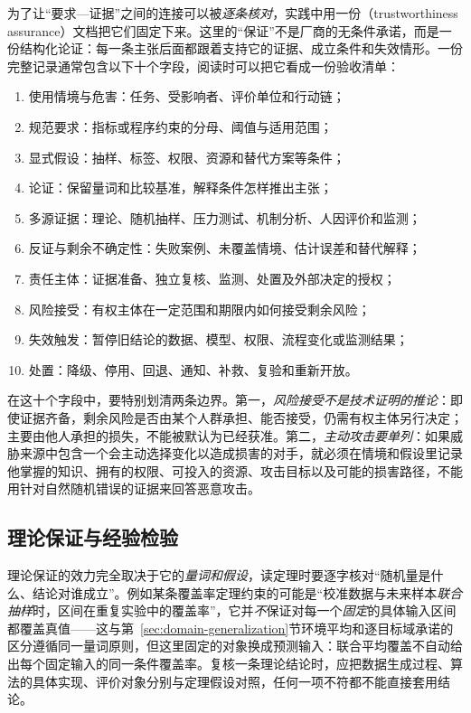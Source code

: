 为了让“要求—证据”之间的连接可以被\emph{逐条核对}，实践中用一份（trustworthiness assurance）文档把它们固定下来。这里的“保证”不是厂商的无条件承诺，而是一份结构化论证：每一条主张后面都跟着支持它的证据、成立条件和失效情形。一份完整记录通常包含以下十个字段，阅读时可以把它看成一份验收清单：
\begin{enumerate}
  \item 使用情境与危害：任务、受影响者、评价单位和行动链；
  \item 规范要求：指标或程序约束的分母、阈值与适用范围；
  \item 显式假设：抽样、标签、权限、资源和替代方案等条件；
  \item 论证：保留量词和比较基准，解释条件怎样推出主张；
  \item 多源证据：理论、随机抽样、压力测试、机制分析、人因评价和监测；
  \item 反证与剩余不确定性：失败案例、未覆盖情境、估计误差和替代解释；
  \item 责任主体：证据准备、独立复核、监测、处置及外部决定的授权；
  \item 风险接受：有权主体在一定范围和期限内如何接受剩余风险；
  \item 失效触发：暂停旧结论的数据、模型、权限、流程变化或监测结果；
  \item 处置：降级、停用、回退、通知、补救、复验和重新开放。
\end{enumerate}
在这十个字段中，要特别划清两条边界。第一，\emph{风险接受不是技术证明的推论}：即使证据齐备，剩余风险是否由某个人群承担、能否接受，仍需有权主体另行决定；主要由他人承担的损失，不能被默认为已经获准。第二，\emph{主动攻击要单列}：如果威胁来源中包含一个会主动选择变化以造成损害的对手，就必须在情境和假设里记录他掌握的知识、拥有的权限、可投入的资源、攻击目标以及可能的损害路径，不能用针对自然随机错误的证据来回答恶意攻击。

\subsection{理论保证与经验检验}

理论保证的效力完全取决于它的\emph{量词和假设}，读定理时要逐字核对“随机量是什么、结论对谁成立”。例如某条覆盖率定理约束的可能是“校准数据与未来样本\emph{联合抽样}时，区间在重复实验中的覆盖率”，它并\emph{不}保证对每一个\emph{固定}的具体输入区间都覆盖真值——这与第~\ref{sec:domain-generalization}节环境平均和逐目标域承诺的区分遵循同一量词原则，但这里固定的对象换成预测输入：联合平均覆盖不自动给出每个固定输入的同一条件覆盖率。复核一条理论结论时，应把数据生成过程、算法的具体实现、评价对象分别与定理假设对照，任何一项不符都不能直接套用结论。

